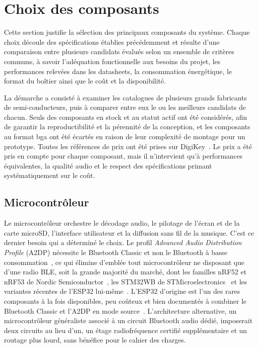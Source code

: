 \section{Choix des composants}
\label{sec:choix_composants}

Cette section justifie la sélection des principaux composants du système. Chaque choix découle des spécifications établies précédemment et résulte d'une comparaison entre plusieurs candidats évalués selon un ensemble de critères communs, à savoir l'adéquation fonctionnelle aux besoins du projet, les performances relevées dans les datasheets, la consommation énergétique, le format du boîtier ainsi que le coût et la disponibilité.

La démarche a consisté à examiner les catalogues de plusieurs grands fabricants de semi-conducteurs, puis à comparer entre eux le ou les meilleurs candidats de chacun. Seuls des composants en stock et au statut actif ont été considérés, afin de garantir la reproductibilité et la pérennité de la conception, et les composants au format \gls{bga} ont été écartés en raison de leur complexité de montage pour un prototype. Toutes les références de prix ont été prises sur DigiKey~\cite{digikey}. Le prix a été pris en compte pour chaque composant, mais il n'intervient qu'à performances équivalentes, la qualité audio et le respect des spécifications primant systématiquement sur le coût.






\subsection{Microcontrôleur}

Le microcontrôleur orchestre le décodage audio, le pilotage de l'écran et de la carte microSD, l'interface utilisateur et la diffusion sans fil de la musique. C'est ce dernier besoin qui a déterminé le choix. Le profil \textit{Advanced Audio Distribution Profile} (A2DP) nécessite le Bluetooth Classic et non le Bluetooth à basse consommation~\cite{bluetooth_sig_a2dp}, ce qui élimine d'emblée tout microcontrôleur ne disposant que d'une radio BLE, soit la grande majorité du marché, dont les familles nRF52 et nRF53 de Nordic Semiconductor~\cite{nordic_nRF52840}, les STM32WB de STMicroelectronics~\cite{stm_STM32WB55} et les variantes récentes de l'ESP32 lui-même~\cite{espressif_soc_comparison}. L'ESP32 d'origine est l'un des rares composants à la fois disponibles, peu coûteux et bien documentés à combiner le Bluetooth Classic et l'A2DP en mode source~\cite{ESP32_IDF_guide}. L'architecture alternative, un microcontrôleur généraliste associé à un circuit Bluetooth audio dédié, imposerait deux circuits au lieu d'un, un étage radiofréquence certifié supplémentaire et un routage plus lourd, sans bénéfice pour le cahier des charges.

